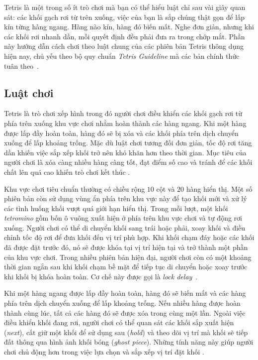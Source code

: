 
Tetris là một trong số ít trò chơi mà bạn có thể hiểu luật chỉ sau vài giây quan sát: các khối gạch rơi từ trên xuống, việc của bạn là sắp chúng thật gọn để lấp kín từng hàng ngang. Hàng nào kín, hàng đó biến mất. Nghe đơn giản, nhưng khi các khối rơi nhanh dần, mỗi quyết định đều phải đưa ra trong chớp mắt. Phần này hướng dẫn cách chơi theo luật chung của các phiên bản Tetris thông dụng hiện nay, chủ yếu theo bộ quy chuẩn \textit{Tetris Guideline} mà các bản chính thức tuân theo~\cite{tetris_wiki,tetris_guideline}.

\subsection{Luật chơi}

Tetris là trò chơi xếp hình trong đó người chơi điều khiển các khối
gạch rơi từ phía trên xuống khu vực chơi nhằm hoàn thành các hàng
ngang. Khi một hàng được lấp đầy hoàn toàn, hàng đó sẽ bị xóa và
các khối phía trên dịch chuyển xuống để lấp khoảng trống. Mặc dù
luật chơi tương đối đơn giản, tốc độ rơi tăng dần khiến việc sắp
xếp khối trở nên khó khăn hơn theo thời gian. Mục tiêu của người
chơi là xóa càng nhiều hàng càng tốt, đạt điểm số cao và tránh để
các khối chất lên quá cao khiến trò chơi kết thúc
\cite{tetris_official,tetris_guideline}.

Khu vực chơi tiêu chuẩn thường có chiều rộng $10$ cột và $20$ hàng
hiển thị. Một số phiên bản còn sử dụng vùng ẩn phía trên khu vực
này để tạo khối mới và xử lý các tình huống khối vượt quá giới hạn
hiển thị. Trong mỗi lượt, một khối \textit{tetromino} gồm bốn ô
vuông xuất hiện ở phía trên khu vực chơi và tự động rơi xuống.
Người chơi có thể di chuyển khối sang trái hoặc phải, xoay khối
và điều chỉnh tốc độ rơi để đưa khối đến vị trí phù hợp. Khi khối
chạm đáy hoặc các khối đã được đặt trước đó, nó sẽ được khóa tại
vị trí hiện tại và trở thành một phần của khu vực chơi. Trong nhiều
phiên bản hiện đại, người chơi còn có một khoảng thời gian ngắn
sau khi khối chạm bề mặt để tiếp tục di chuyển hoặc xoay trước
khi khối bị khóa hoàn toàn. Cơ chế này được gọi là
\textit{lock delay}~\cite{tetris_guideline,tetris_lock}.

Khi một hàng ngang được lấp đầy hoàn toàn, hàng đó sẽ biến mất
và các hàng phía trên dịch chuyển xuống để lấp khoảng trống.
Nếu nhiều hàng được hoàn thành cùng lúc, tất cả các hàng đó sẽ
được xóa trong cùng một lần. Ngoài việc điều khiển khối đang
rơi, người chơi có thể quan sát các khối sắp xuất hiện
(\textit{next}), cất giữ một khối để sử dụng sau (\textit{hold})
và theo dõi vị trí mà khối sẽ tiếp đất thông qua hình ảnh khối
bóng (\textit{ghost piece}). Những tính năng này giúp người chơi
chủ động hơn trong việc lựa chọn và sắp xếp vị trí đặt khối
\cite{tetris_guideline}.

